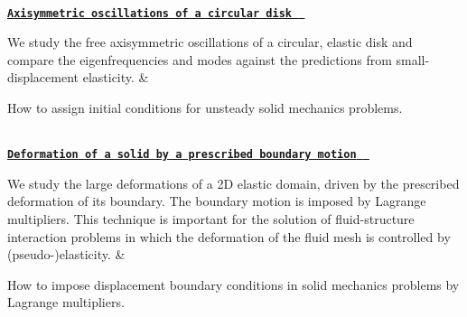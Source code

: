\begin{longtabu}
\\
\href{../../solid/disk_oscillation/html/index.html}{\tt {\bfseries Axisymmetric oscillations of a circular disk } }

We study the free axisymmetric oscillations of a circular, elastic disk and compare the eigenfrequencies and modes against the predictions from small-\/displacement elasticity.  &
\begin{DoxyItemize}
\item How to assign initial conditions for unsteady solid mechanics problems. 
\end{DoxyItemize}

\\
\href{../../solid/prescribed_displ_lagr_mult/html/index.html}{\tt {\bfseries Deformation of a solid by a prescribed boundary motion } }

We study the large deformations of a 2D elastic domain, driven by the prescribed deformation of its boundary. The boundary motion is imposed by Lagrange multipliers. This technique is important for the solution of fluid-\/structure interaction problems in which the deformation of the fluid mesh is controlled by (pseudo-\/)elasticity.  &
\begin{DoxyItemize}
\item How to impose displacement boundary conditions in solid mechanics problems by Lagrange multipliers. 
\end{DoxyItemize}



\\
\end{longtabu}
\tabulinesep=1mm
